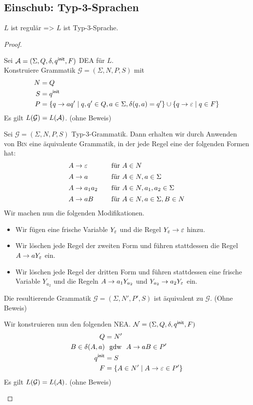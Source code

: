 \subsection{Einschub: Typ-3-Sprachen}
\begin{Satz}[name={[Typ-3-Sprache ist regulär]}]
	$L$ ist regulär \<=> $L$ ist Typ-3-Sprache.
\end{Satz}
\begin{proof}
	\begin{description}[font=\normalfont,labelwidth=\widthof{"'\=>"':},leftmargin=!]
	\item["`\=>"'] Sei $\mathcal{A} =(\Sigma, Q,\delta,q^\mathsf{init},F)$ \ac{DEA} für $L$.\\
		Konstruiere Grammatik $\mathcal{G}=(\Sigma,N,P,S)$ mit
		\begin{align*}
		 N &= Q\\
		 S &= q^\mathsf{init}\\
		 P &= \{ q\rightarrow aq'\mid q,q'\in Q, a\in\Sigma, \delta(q,a)=q'\}\cup \{ q\rightarrow\varepsilon\mid q\in F\}
		\end{align*}
		Es gilt $L(\mathcal{G})=L(\mathcal{A})$. (ohne Beweis)
	\item["`\<="'] Sei $\mathcal{G}=(\Sigma,N,P,S)$ Typ-3-Grammatik.
	Dann erhalten wir durch Anwenden von \textsc{Bin} eine äquivalente Grammatik, in der jede Regel eine der folgenden Formen hat:
	  \begin{alignat*}{3}
	 A &\-> \Eps && \quad \text{für } A\in N\\[0.5mm]
   A &\-> a && \quad \text{für } A\in N, a\in\Sigma\\[0.5mm]
   A &\-> a_1a_2 && \quad \text{für } A\in N, a_1,a_2\in\Sigma\\[0.5mm]
   A &\-> aB && \quad \text{für } A\in N, a\in\Sigma, B\in N
  \end{alignat*}
  Wir machen nun die folgenden Modifikationen.
  \begin{itemize}
   \item Wir fügen eine frische Variable $Y_{\varepsilon}$ und die Regel $Y_{\varepsilon}\rightarrow\varepsilon$ hinzu.
   \item Wir löschen jede Regel der zweiten Form und führen stattdessen die Regel $A \-> aY_{\Eps}$ ein.
  \item Wir löschen jede Regel der dritten Form und führen stattdessen eine frische Variable $Y_{a_2}$ und die Regeln $A \-> a_1Y_{a_2}$ und $Y_{a_2} \-> a_2Y_\Eps$ ein.
  \end{itemize}
	Die resultierende Grammatik $\mathcal{G}=(\Sigma,N',P',S)$ ist äquivalent zu $\mathcal{G}$. (Ohne Beweis)

	Wir konstruieren nun den folgenden NEA. $\mathcal{N}=(\Sigma,Q,\delta,q^\mathsf{init},F)$
	\begin{alignat*}{2}
		Q &=N'\\
		B\in\delta(A,a) & \text{ \  gdw \ } A\rightarrow aB \in P'\\
		q^\mathsf{init} &=S\\
		F &= \{ A\in N'\mid A\rightarrow\varepsilon\in P'\}
	\end{alignat*}
		Es gilt $L(\mathcal{G})=L(\mathcal{A})$. (ohne Beweis) \qedhere

	\end{description}
\end{proof}


